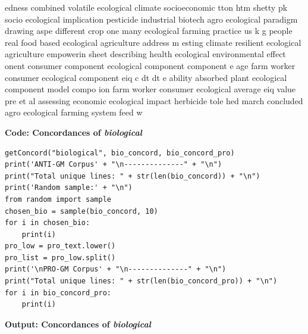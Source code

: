 \begin{footnotesize}
edness combined volatile ecological climate socioeconomic\newline
tton htm shetty pk socio ecological implication pesticide\newline
 industrial biotech agro ecological paradigm drawing aspe\newline
 different crop one many ecological farming practice us k\newline
g people real food based ecological agriculture address m\newline
esting climate resilient ecological agriculture empowerin\newline
 sheet describing health ecological environmental effect \newline
onent consumer component ecological component component e\newline
age farm worker consumer ecological component eiq c dt dt\newline
e ability absorbed plant ecological component model compo\newline
ion farm worker consumer ecological average eiq value pre\newline
et al assessing economic ecological impact herbicide tole\newline
hed march concluded agro ecological farming system feed w
\end{footnotesize}

\textbf{Code: Concordances of \textit{biological}}

\begin{lstlisting}
getConcord("biological", bio_concord, bio_concord_pro)
print('ANTI-GM Corpus' + "\n--------------" + "\n")             
print("Total unique lines: " + str(len(bio_concord)) + "\n")
print('Random sample:' + "\n") 
from random import sample
chosen_bio = sample(bio_concord, 10)
for i in chosen_bio:
    print(i)
pro_low = pro_text.lower()
pro_list = pro_low.split()
print('\nPRO-GM Corpus' + "\n--------------" + "\n")            
print("Total unique lines: " + str(len(bio_concord_pro)) + "\n")
for i in bio_concord_pro:
    print(i)
\end{lstlisting}

\textbf{Output: Concordances of \textit{biological}}

